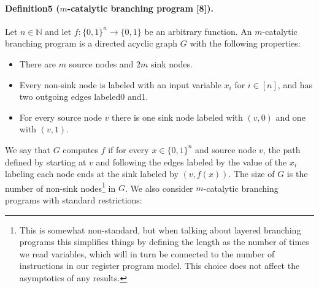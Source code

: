 \documentclass[10pt,a4paper]{article}
\begin{document}
\paragraph{Definition5 ($m$-catalytic branching program [8]).} Let $n\in\mathbb N$ and let $f:\{0,1\}^n\to\{0,1\}$ be an arbitrary function. An $m$-catalytic branching program is a directed acyclic graph $G$ with the following properties:
\begin{itemize}
\item There are $m$ source nodes and $2m$ sink nodes.
\item Every non-sink node is labeled with an input variable $x_i$ for $i\in[n]$, and has two outgoing edges labeled0 and1.
\item For every source node $v$ there is one sink node labeled with $(v,0)$ and one with $(v,1)$.
\end{itemize}
We say that $G$ computes $f$ if for every $x\in\{0,1\}^n$ and source node $v$, the path defined by starting at $v$ and following the edges labeled by the value of the $x_i$ labeling each node ends at the sink labeled by $(v,f(x))$. The size of $G$ is the number of non-sink nodes\footnote{This is somewhat non-standard, but when talking about layered branching programs this simplifies things by defining the length as the number of times we read variables, which will in turn be connected to the number of instructions in our register program model. This choice does not affect the asymptotics of any results.} in $G$.
We also consider $m$-catalytic branching programs with standard restrictions:
\end{document}
